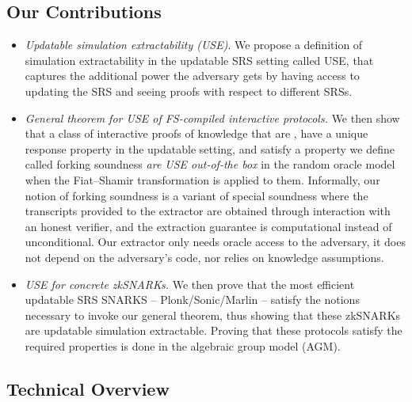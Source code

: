 \subsection{Our Contributions}
\begin{itemize}
\item 
\emph{Updatable simulation extractability (USE)}. 
We propose a definition of simulation extractability in the updatable SRS setting called USE, that captures the additional power the adversary gets by having access to updating the SRS and seeing proofs with respect to different SRSs.
    
\item 
\emph{General theorem for USE of FS-compiled interactive protocols.}
We then show that a class of interactive proofs of knowledge that are ,
have a unique response property in the updatable setting, and satisfy a property we define called forking soundness \emph{are USE out-of-the box} in the random oracle model when the Fiat--Shamir transformation is applied to them. 
Informally, our notion of forking soundness is a variant of special soundness where the transcripts provided to the extractor are
obtained through interaction with an honest verifier, and the extraction guarantee is computational instead of unconditional. 
Our extractor only needs oracle access to the adversary, it does not depend on the adversary’s code, nor relies on knowledge
assumptions.
    
\item
\emph{USE for concrete zkSNARKs.}
We then prove that the most efficient updatable SRS SNARKS -- Plonk/Sonic/Marlin -- satisfy the notions necessary to invoke our general theorem, thus showing that these zkSNARKs are updatable simulation extractable.
Proving that these protocols satisfy the required properties is done in the algebraic group model (AGM).
	
\end{itemize}



\subsection{Technical Overview}

